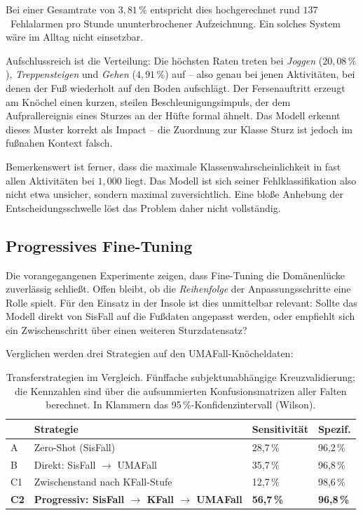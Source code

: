 \documentclass[11pt,a4paper,oneside]{report}
\begin{document}
Bei einer Gesamtrate von $3{,}81\,\%$ entspricht dies hochgerechnet
rund $137$~Fehlalarmen pro Stunde ununterbrochener Aufzeichnung. Ein
solches System wäre im Alltag nicht einsetzbar.

Aufschlussreich ist die Verteilung: Die höchsten Raten treten bei
\emph{Joggen} ($20{,}08\,\%$), \emph{Treppensteigen} und
\emph{Gehen} ($4{,}91\,\%$) auf -- also genau bei jenen Aktivitäten, bei
denen der Fuß wiederholt auf den Boden aufschlägt. Der Fersenauftritt
erzeugt am Knöchel einen kurzen, steilen Beschleunigungsimpuls, der
dem Aufprallereignis eines Sturzes an der Hüfte formal ähnelt. Das
Modell erkennt dieses Muster korrekt als Impact -- die Zuordnung zur
Klasse \glqq Sturz\grqq{} ist jedoch im fußnahen Kontext falsch.

Bemerkenswert ist ferner, dass die maximale Klassenwahrscheinlichkeit
in fast allen Aktivitäten bei $1{,}000$ liegt. Das Modell ist sich
seiner Fehlklassifikation also nicht etwa unsicher, sondern maximal
zuversichtlich. Eine bloße Anhebung der Entscheidungsschwelle löst
das Problem daher nicht vollständig.

\subsection{Progressives Fine-Tuning}
\label{sec:progressive}

Die vorangegangenen Experimente zeigen, dass Fine-Tuning die
Domänenlücke zuverlässig schließt. Offen bleibt, ob die
\emph{Reihenfolge} der Anpassungsschritte eine Rolle spielt. Für den
Einsatz in der Insole ist dies unmittelbar relevant: Sollte das
Modell direkt von SisFall auf die Fußdaten angepasst werden, oder
empfiehlt sich ein Zwischenschritt über einen weiteren
Sturzdatensatz?

Verglichen werden drei Strategien auf den UMAFall-Knöcheldaten:

\begin{table}[H]
\centering
\caption{Transferstrategien im Vergleich. Fünffache
         subjektunabhängige Kreuzvalidierung; die Kennzahlen sind
         über die aufsummierten Konfusionsmatrizen aller Falten
         berechnet. In Klammern das 95\,\%-Konfidenzintervall
         (Wilson).}
\label{tab:progressive}
\small
\begin{tabularx}{\textwidth}{l X C{2.9cm} C{1.6cm}}
\toprule
& \textbf{Strategie} & \textbf{Sensitivität} & \textbf{Spezif.} \\
\midrule
A & Zero-Shot (SisFall) & 28,7\,\% \enskip [22,2; 36,2] & 96,2\,\% \\
B & Direkt: SisFall $\rightarrow$ UMAFall & 35,7\,\% \enskip [28,6; 43,4] & 96,8\,\% \\
C1 & Zwischenstand nach KFall-Stufe & 12,7\,\% \enskip [8,4; 18,9] & 98,6\,\% \\
\textbf{C2} & \textbf{Progressiv: SisFall $\rightarrow$ KFall $\rightarrow$ UMAFall} & \textbf{56,7\,\% \enskip [48,9; 64,2]} & \textbf{96,8\,\%} \\
\bottomrule
\end{tabularx}
\end{table}
\end{document}
